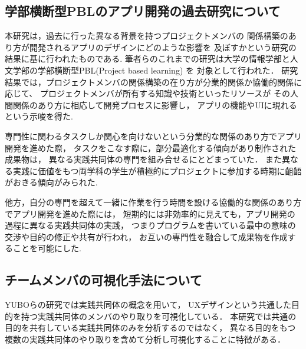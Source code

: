 \subsection{学部横断型PBLのアプリ開発の過去研究について}

本研究は，過去に行った異なる背景を持つプロジェクトメンバの
関係構築のあり方が開発されるアプリのデザインにどのような影響を
及ぼすかという研究\cite{preStudy}の結果に基に行われたものである.
筆者らのこれまでの研究は大学の情報学部と人文学部の学部横断型PBL(Project based learning) を
対象として行われた．
研究結果では，プロジェクトメンバの関係構築の在り方が分業的関係か協働的関係に応じて、
プロジェクトメンバが所有する知識や技術といったリソースが
その人間関係のあり方に相応して開発プロセスに影響し，
アプリの機能やUIに現れるという示唆を得た.

専門性に関わるタスクしか関心を向けないという分業的な関係のあり方でアプリ開発を進めた際，
タスクをこなす際に，部分最適化する傾向があり制作された成果物は，
異なる実践共同体の専門を組み合せるにとどまっていた．
また異なる実践に価値をもつ両学科の学生が積極的にプロジェクトに参加する時期に齟齬がおきる傾向がみられた.

他方，自分の専門を超えて一緒に作業を行う時間を設ける協働的な関係のあり方
でアプリ開発を進めた際には，
短期的には非効率的に見えても，アプリ開発の過程に異なる実践共同体の実践，
つまりプログラムを書いている最中の意味の交渉や目的の修正や共有が行われ，
お互いの専門性を融合して成果物を作成することを可能にした.

\subsection{チームメンバの可視化手法について}


YUBOら\cite{D3jsOfCop}の研究では実践共同体の概念を用いて，
UXデザインという共通した目的を持つ実践共同体のメンバのやり取りを可視化している．
本研究では共通の目的を共有している実践共同体のみを分析するのではなく，
異なる目的をもつ複数の実践共同体のやり取りを含めて分析し可視化することに特徴がある．
